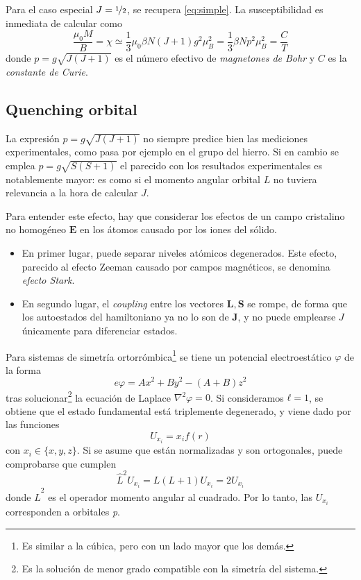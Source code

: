 \documentclass{tufte-book}
\newcommand{\oh}{{\nicefrac{1}{2}} }
\newcommand{\sub}[1]{_{{\scriptscriptstyle\mathit{#1}}}}
\newcommand{\mb}{μ\sub{B}}
\begin{document}
Para el caso especial $J=\oh$, se recupera \eqref{eq:simple}. La
susceptibilidad es inmediata de calcular como
\begin{equation}
  \frac{μ_0M}{B} = χ ≃ \frac{1}{3} μ_0βN(J+1)g^2μ^2\sub{B} = \frac{1}{3}
  βNp^2\mb^2 = \frac{C}{T}
  \label{eq:curielaw}
\end{equation}
donde $p=g\sqrt{J(J+1)}$ es el número efectivo de \emph{magnetones de
  Bohr} y $C$ es la \emph{constante de Curie}.


\subsection{Quenching orbital}
La expresión $p=g\sqrt{J(J+1)}$ no siempre predice bien las mediciones
experimentales, como pasa por ejemplo en el grupo del hierro. Si en
cambio se emplea $p=g\sqrt{S(S+1)}$ el parecido con los resultados
experimentales es notablemente mayor: es como si el momento angular orbital
$L$ no tuviera relevancia a la hora de calcular $J$.

Para entender este efecto, hay que considerar los efectos de un campo
cristalino no homogéneo $\symbf{E}$ en los átomos causado por los
iones del sólido.

\begin{itemize}
\item En primer lugar, puede separar niveles
atómicos degenerados. Este efecto, parecido al efecto Zeeman causado
por campos magnéticos, se denomina \emph{efecto Stark}.
\item En segundo lugar, el \textit{coupling} entre los vectores
  $\symbf{L},\symbf{S}$ se rompe, de forma que los autoestados del
  hamiltoniano ya no lo son de $\symbf{J}$, y no puede emplearse $J$
  únicamente para diferenciar estados.
\end{itemize}

Para sistemas de simetría ortorrómbica\footnote{Es similar a la cúbica, pero con un lado mayor que los demás.}
se tiene un potencial electroestático $φ$ de la forma
\begin{equation}
  eφ = Ax^2 + By^2 -(A+B)z^2
\end{equation}
tras solucionar\footnote{
  Es la solución de menor grado compatible con la simetría del
  sistema.
} la ecuación de Laplace $∇^2φ=0$. Si consideramos $ℓ=1$, se obtiene
que el estado fundamental está triplemente degenerado, y viene dado
por las funciones
\begin{equation}
  U_{x_i} = x_i f(r)
\end{equation}
con $x_i ∈\{x,y,z\}$. Si se asume que están normalizadas y son
ortogonales, puede comprobarse que cumplen
\begin{equation}
  \hat{L}^2 U_{x_i} = L(L+1) U_{x_i} = 2U_{x_i}
\end{equation}
donde $\hat{L}^2$ es el operador momento angular al cuadrado. Por lo
tanto, las $U_{x_i}$ corresponden a orbitales \textit{p}.
\end{document}
